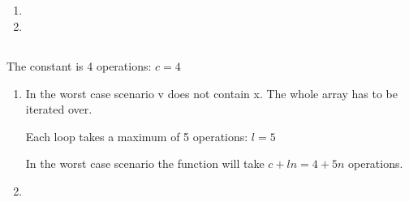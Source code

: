 \documentclass[12pt]{article}
\begin{document}
\subsection{} %
\begin{enumerate}[a]
	\item %
	\item %
\end{enumerate}

\subsection{} %
The constant is 4 operations: $c = 4$

\begin{enumerate}[a]
	\item %
	In the worst case scenario v does not contain x. The whole array has to be iterated over.

	Each loop takes a maximum of 5 operations: $l = 5$

	In the worst case scenario the function will take $c + ln = 4 + 5n$ operations.

	\item %
\end{enumerate}

\subsection{} %

\subsection{} %


\subsection{} %

\end{document}
